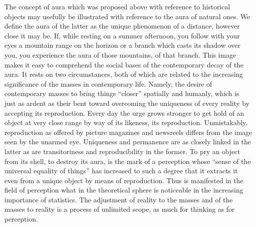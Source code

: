 \documentclass[11pt, letterpaper]{article}
\begin{document}
The concept of aura which was proposed above with reference to historical
objects may usefully be illustrated with reference to the aura of natural ones.
We define the aura of the latter as the unique phenomenon of a distance,
however close it may be. If, while resting on a summer afternoon, you follow
with your eyes a mountain range on the horizon or a branch which casts its
shadow over you, you experience the aura of those mountains, of that branch.
This image makes it easy to comprehend the social bases of the contemporary
decay of the aura. It rests on two circumstances, both of which are related to
the increasing significance of the masses in contemporary life. Namely, the
desire of contemporary masses to bring things “closer” spatially and humanly,
which is just as ardent as their bent toward overcoming the uniqueness of every
reality by accepting its reproduction. Every day the urge grows stronger to get
hold of an object at very close range by way of its likeness, its reproduction.
Unmistakably, reproduction as offered by picture magazines and newsreels
differs from the image seen by the unarmed eye. Uniqueness and permanence are
as closely linked in the latter as are transitoriness and reproducibility in
the former. To pry an object from its shell, to destroy its aura, is the mark
of a perception whose “sense of the universal equality of things” has increased
to such a degree that it extracts it even from a unique object by means of
reproduction. Thus is manifested in the field of perception what in the
theoretical sphere is noticeable in the increasing importance of statistics.
The adjustment of reality to the masses and of the masses to reality is a
process of unlimited scope, as much for thinking as for perception.

\section{}
\end{document}
